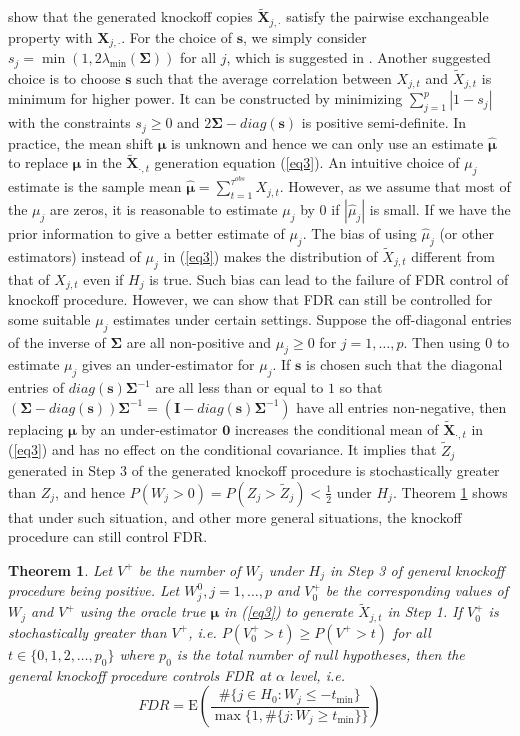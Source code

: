 \documentclass[]{interact}
\theoremstyle{plain}%
\newtheorem{theorem}{Theorem}[section]
\theoremstyle{definition}
\theoremstyle{remark}
\newcommand{\E}{\mathrm{E}}
\begin{document}
\cite{barber2015controlling} show that the generated knockoff copies $\bm{\tilde X}_{j, \cdot}$ satisfy the pairwise exchangeable property with $\bm X_{j, \cdot}$. For the choice of $\bm s$, we simply consider $s_j = \min \left(1, 2 \lambda_{\min}(\bm \Sigma)\right)$ for all $j$, which is suggested in \cite{barber2015controlling}. Another suggested choice is to choose $\bm s$ such that the average correlation between $X_{j,t}$ and $\tilde X_{j,t}$ is minimum for higher power. It can be constructed by minimizing $\sum_{j=1}^p |1 - s_j|$ with the constraints $s_j \ge 0$ and $2 \bm \Sigma - diag(\bm s)$ is positive semi-definite. In practice, the mean shift $\bm \mu$ is unknown and hence we can only use an estimate $\bm{\hat \mu}$ to replace $\bm \mu$ in the $\bm{\tilde X}_{\cdot,t}$ generation equation (\ref{eq3}). An intuitive choice of $\mu_j$ estimate is the sample mean $\bm{\hat \mu} = \sum_{t=1}^{\tau^{obs}} X_{j,t}$. However, as we assume that most of the $\mu_j$ are zeros, it is reasonable to estimate $\mu_j$ by 0 if $|\hat \mu_j|$ is small. If we have the prior information to give a better estimate of $\mu_j$. The bias of using $\hat \mu_j$ (or other estimators) instead of $\mu_j$ in (\ref{eq3}) makes the distribution of $\tilde X_{j,t}$ different from that of $X_{j,t}$ even if $H_j$ is true. Such bias can lead to the failure of FDR control of knockoff procedure. However, we can show that FDR can still be controlled for some suitable $\mu_j$ estimates under certain settings. Suppose the off-diagonal entries of the inverse of $\bm \Sigma$ are all non-positive and $\mu_j \ge 0$ for $j=1, \ldots, p$. Then using 0 to estimate $\mu_j$ gives an under-estimator for $\mu_j$. If $\bm s$ is chosen such that the diagonal entries of $diag(\bm s) \bm \Sigma^{-1}$ are all less than or equal to $1$ so that $(\bm \Sigma - diag (\bm s)) \bm \Sigma^{-1} = (\bm I - diag(\bm s) \bm \Sigma^{-1})$ have all entries non-negative, then replacing $\bm \mu$ by an under-estimator $\bm 0$ increases the conditional mean of $\bm{\tilde X}_{\cdot, t}$ in (\ref{eq3}) and has no effect on the conditional covariance. It implies that $\tilde Z_j$ generated in Step 3 of the generated knockoff procedure is stochastically greater than $Z_j$, and hence $P(W_j > 0) = P(Z_j > \tilde Z_j) < \frac{1}{2}$ under $H_j$. Theorem \ref{theo1} shows that under such situation, and other more general situations, the knockoff procedure can still control FDR.
\begin{theorem}\label{theo1}
Let $V^+$ be the number of $W_j$ under $H_j$ in Step 3 of general knockoff procedure being positive. Let $W_j^0, j=1, \ldots, p$ and $V_0^+$ be the corresponding values of $W_j$ and $V^+$ using the oracle true $\bm \mu$ in (\ref{eq3}) to generate $\tilde X_{j,t}$ in Step 1. If $V_0^+$ is stochastically greater than $V^+$, i.e. $P(V_0^+ > t) \ge P(V^+ > t)$ for all $t \in \{0, 1, 2, \ldots, p_0\}$ where $p_0$ is the total number of null hypotheses, then the general knockoff procedure controls FDR at $\alpha$ level, i.e.
\begin{equation}\label{eq4}
FDR = \E \left ( \frac{\# \{j \in H_0: W_j \le -t_{\min}\}}{\max \{1, \# \{j: W_j \ge t_{\min}\}\}}\right )
\end{equation}
\end{theorem}
\end{document}
